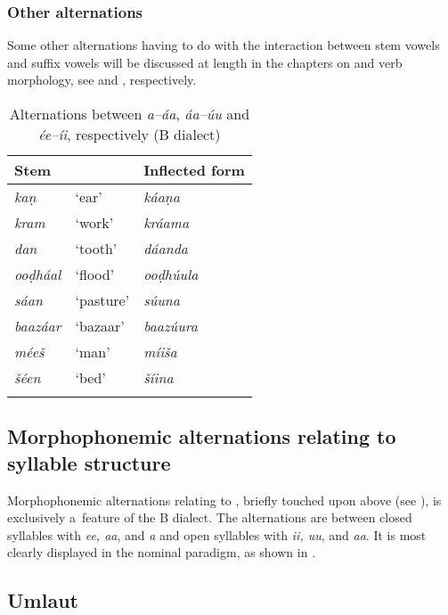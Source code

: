 \subsubsection*{Other alternations}

Some other alternations having to do with the interaction between stem vowels and suffix vowels will
be discussed at length in the chapters on  and verb morphology, see  and
, respectively.


\begin{table}[p]
\caption{Alternations between \textit{a--áa}, \textit{áa--úu} and \textit{ée--íi}, respectively (B dialect)}
\begin{tabularx}{\textwidth}{ Q Q Q }
\lsptoprule
Stem &
&
Inflected form\\\midrule
\textit{kaṇ} &
`ear' &
\textit{káaṇa} \\
\textit{kram} &
`work' &
\textit{kráama} \\
\textit{dan} &
`tooth' &
\textit{dáanda} \\
\textit{ooḍháal} &
`flood' &
\textit{ooḍhúula} \\
\textit{sáan} &
`pasture' &
\textit{súuna} \\
\textit{baazáar} &
`bazaar' &
\textit{baazúura} \\
\textit{méeš} &
`man' &
\textit{míiša} \\
\textit{šéen} &
`bed' &
\textit{šíina} \\\lspbottomrule
\end{tabularx}
\label{tab:3-15}
\end{table}
\clearpage
\subsection{Morphophonemic alternations relating to {syllable} structure}
\label{subsec:3-5-2}

Morphophonemic alternations relating to , briefly touched upon above (see ), is exclusively a~feature of the B dialect. The alternations are between closed syllables with \textit{ee, aa}, and \textit{a} and open syllables with \textit{ii, uu}, and \textit{aa}. It is most clearly displayed in the nominal paradigm, as shown in .





\subsection{Umlaut}
\label{subsec:3-5-3}

